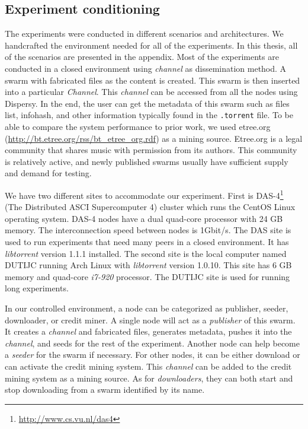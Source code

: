 \subsection{Experiment conditioning}
The experiments were conducted in different scenarios and architectures. We handcrafted the environment needed for all of the experiments. In this thesis, all of the scenarios are presented in the appendix. Most of the experiments are conducted in a closed environment using \textit{channel} as dissemination method. A swarm with fabricated files as the content is created. This swarm is then inserted into a particular \textit{Channel}. This \textit{channel} can be accessed from all the nodes using Dispersy. In the end, the user can get the metadata of this swarm such as files list, infohash, and other information typically found in the \texttt{.torrent} file. To be able to compare the system performance to prior work, we used etree.org (\url{http://bt.etree.org/rss/bt_etree_org.rdf}) as a mining source. Etree.org is a legal community that shares music with permission from its authors. This community is relatively active, and newly published swarms usually have sufficient supply and demand for testing. 

We have two different sites to accommodate our experiment. First is DAS-4\footnote{\url{http://www.cs.vu.nl/das4}} (The Distributed ASCI Supercomputer 4) cluster which runs the CentOS Linux operating system. DAS-4 nodes have a dual quad-core processor with 24 GB memory. The interconnection speed between nodes is 1Gbit/s. The DAS site is used to run experiments that need many peers in a closed environment. It has \textit{libtorrent} version 1.1.1 installed. The second site is the local computer named DUTIJC running Arch Linux with \textit{libtorrent} version 1.0.10. This site has 6 GB memory and quad-core \textit{i7-920} processor. The DUTIJC site is used for running long experiments. 

In our controlled environment, a node can be categorized as publisher, seeder, downloader, or credit miner. A single node will act as a \textit{publisher} of this swarm. It creates a \textit{channel} and fabricated files, generates metadata, pushes it into the \textit{channel}, and seeds for the rest of the experiment. Another node can help become a \textit{seeder} for the swarm if necessary. For other nodes, it can be either download or can activate the credit mining system. This \textit{channel} can be added to the credit mining system as a mining source. As for \textit{downloaders}, they can both start and stop downloading from a swarm identified by its name. 


